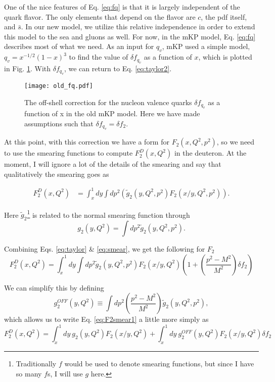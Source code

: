 \documentclass[12pt]{article}
\begin{document}
One of the nice features of Eq. \ref{eq:fq} is that it is largely independent of the quark flavor.  The only elements that depend on the flavor are $c$, the pdf itself, and $\bar{s}$.  In our new model, we utilize this relative independence in order to extend this model to the sea and gluons as well.  For now, in the mKP model, Eq. \ref{eq:fq} describes most of what we need.  As an input for $q_v$, mKP used a simple model, $q_v=x^{-1/2}(1-x)^3$ to find the value of $\delta f_{q_v}$ as a function of $x$, which is plotted in Fig. \ref{fig:old_fq}.  With $\delta f_{q_v}$, we can return to Eq. \ref{eq:taylor2}.
\begin{figure}[t]
\centering
\texttt{[image: old\_fq.pdf]}
\caption{The off-shell correction for the nucleon valence quarks $\delta f_{q_v}$ as a function of x in the old mKP model.  Here we have made assumptions such that $\delta f_{q_v}=\delta f_2$.}
\label{fig:old_fq}
\end{figure}

At this point, with this correction we have a form for $F_2(x,Q^2,p^2)$, so we need to use the smearing functions to compute $F_2^D(x,Q^2)$ in the deuteron.  At the moment, I will ignore a lot of the details of the smearing and say that qualitatively the smearing goes as

\begin{subequations}
\label{eq:smear}
\begin{align}
F_2^D(x,Q^2)&=\int_{x}^1 dy \int dp^2 \left(\tilde{g}_2(y,Q^2,p^2) F_2(x/y,Q^2,p^2)\right).
\end{align}
\end{subequations}

Here $\tilde{g}_2$\footnote{Traditionally $f$ would be used to denote smearing functions, but since I have so many $f$s, I will use $g$ here.} is related to the normal smearing function through
\begin{equation}
g_2(y,Q^2) = \int dp^2 \tilde{g}_2(y,Q^2,p^2).
\end{equation}

Combining Eqs. \ref{eq:taylor} \& \ref{eq:smear}, we get the following for $F_2$
\begin{equation}
\label{eq:F2smear1}
F_2^D(x,Q^2)=\int_{x}^1 dy \int dp^2 \tilde{g}_2(y,Q^2,p^2) F_2(x/y,Q^2)\left(1+\left(\frac{p^2-M^2}{M^2}\right)\delta f_2\right)
\end{equation}

We can simplify this by defining
\begin{equation}
\label{eq:g_off}
g^{OFF}_2(y,Q^2)\equiv\int dp^2 \left(\frac{p^2-M^2}{M^2}\right)\tilde{g}_2(y,Q^2,p^2),
\end{equation}
which allows us to write Eq. \ref{eq:F2smear1} a little more simply as
\begin{equation}
\label{eq:F2smear2}
F_2^D(x,Q^2)=\int_{x}^1 dy~g_2(y,Q^2) F_2(x/y,Q^2)+\int_x^1 dy~g_2^{OFF}(y,Q^2)F_2(x/y,Q^2)\delta f_2
\end{equation}
\end{document}
